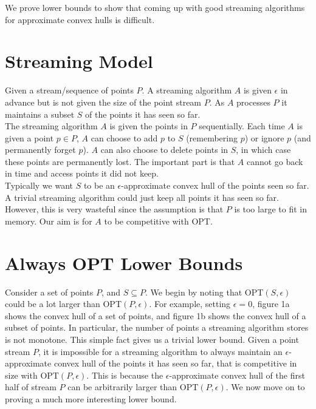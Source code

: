 We prove lower bounds to show that coming up with good streaming algorithms for approximate convex hulls is difficult.

\section{Streaming Model}

Given a stream/sequence of points $P$. A streaming algorithm $A$ is given $\epsilon$ in advance but is not given the size of the point stream $P$. As $A$ processes $P$ it maintains a subset $S$ of the points it has seen so far.
\\

The streaming algorithm $A$ is given the points in $P$ sequentially. Each time $A$ is given a point $p \in P$, $A$ can choose to add $p$ to $S$ (remembering $p$) or ignore $p$ (and permanently forget $p$). $A$ can also choose to delete points in $S$, in which case these points are permanently lost. The important part is that $A$ cannot go back in time and access points it did not keep.
\\

Typically we want $S$ to be an $\epsilon$-approximate convex hull of the points seen so far. A trivial streaming algorithm could just keep all points it has seen so far. However, this is very wasteful since the assumption is that $P$ is too large to fit in memory. Our aim is for $A$ to be competitive with OPT.

% 
% 

\section{Always OPT Lower Bounds}

Consider a set of points $P$, and $S \subseteq P$. We begin by noting that OPT$(S, \epsilon)$ could be a lot larger than OPT$(P, \epsilon)$. For example, setting $\epsilon = 0$, figure 1a shows the convex hull of a set of points, and figure 1b shows the convex hull of a subset of points. In particular, the number of points a streaming algorithm stores is not monotone. This simple fact gives us a trivial lower bound. Given a point stream $P$, it is impossible for a streaming algorithm to always maintain an $\epsilon$-approximate convex hull of the points it has seen so far, that is competitive in size with OPT$(P, \epsilon)$. This is because the $\epsilon$-approximate convex hull of the first half of stream $P$ can be arbitrarily larger than OPT$(P, \epsilon)$. We now move on to proving a much more interesting lower bound.
\\

